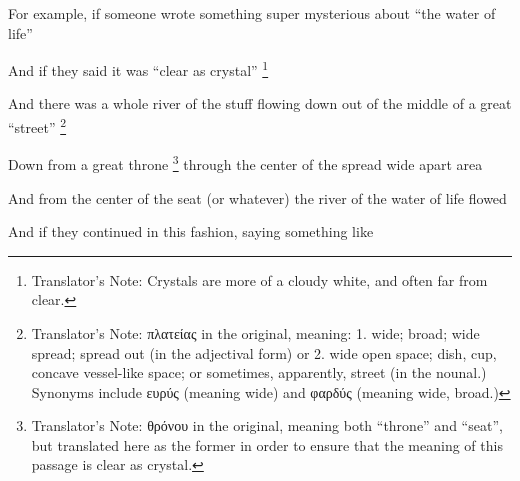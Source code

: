 {{                For example, if someone wrote something super mysterious about ``the water of life''

                And if they said it was ``clear as crystal''%
                \footnote{%
                    Translator's Note: Crystals are more of a cloudy white,
                    and often far from clear.
                }%

                And there was a whole river of the stuff flowing down out of the middle of a great ``street''%
                \footnote{
                \label{fn:street}%
                    Translator's Note: πλατείας in the original, meaning:
                    1. wide; broad; wide spread; spread out (in the adjectival form) or
                    2. wide open space; dish, cup, concave vessel-like space;
                       or sometimes, apparently, street (in the nounal.)
                    Synonyms include ευρύς (meaning wide) and φαρδύς (meaning wide, broad.)
                }%

                Down from a great throne%
                \footnote{
                \label{fn:seat}%
                    Translator's Note: θρόνου in the original, meaning both ``throne'' and ``seat'',
                    but translated here as the former in order to ensure that the meaning of this passage
                    is clear as crystal.
                }
                through the center of the spread wide apart area

                And from the center of the seat
                (or whatever) the river of the water of life flowed

                And if they continued in this fashion, saying something like

}}
